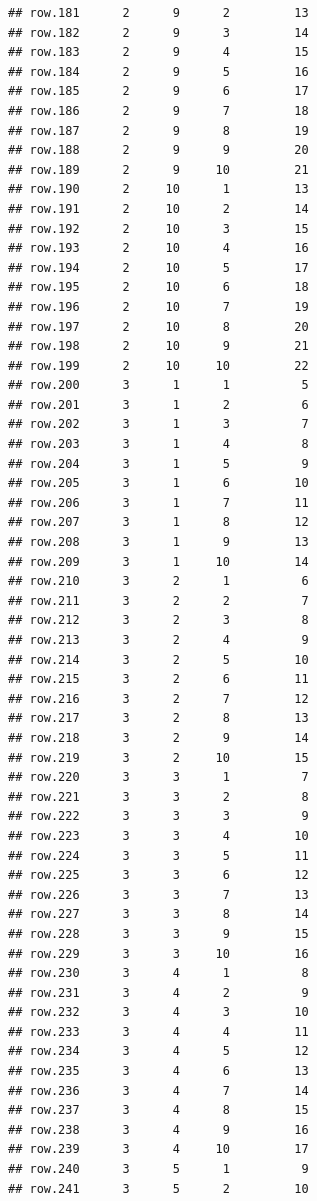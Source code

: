 \documentclass[
]{article}
\begin{document}
\begin{verbatim}
## row.181      2      9      2         13
## row.182      2      9      3         14
## row.183      2      9      4         15
## row.184      2      9      5         16
## row.185      2      9      6         17
## row.186      2      9      7         18
## row.187      2      9      8         19
## row.188      2      9      9         20
## row.189      2      9     10         21
## row.190      2     10      1         13
## row.191      2     10      2         14
## row.192      2     10      3         15
## row.193      2     10      4         16
## row.194      2     10      5         17
## row.195      2     10      6         18
## row.196      2     10      7         19
## row.197      2     10      8         20
## row.198      2     10      9         21
## row.199      2     10     10         22
## row.200      3      1      1          5
## row.201      3      1      2          6
## row.202      3      1      3          7
## row.203      3      1      4          8
## row.204      3      1      5          9
## row.205      3      1      6         10
## row.206      3      1      7         11
## row.207      3      1      8         12
## row.208      3      1      9         13
## row.209      3      1     10         14
## row.210      3      2      1          6
## row.211      3      2      2          7
## row.212      3      2      3          8
## row.213      3      2      4          9
## row.214      3      2      5         10
## row.215      3      2      6         11
## row.216      3      2      7         12
## row.217      3      2      8         13
## row.218      3      2      9         14
## row.219      3      2     10         15
## row.220      3      3      1          7
## row.221      3      3      2          8
## row.222      3      3      3          9
## row.223      3      3      4         10
## row.224      3      3      5         11
## row.225      3      3      6         12
## row.226      3      3      7         13
## row.227      3      3      8         14
## row.228      3      3      9         15
## row.229      3      3     10         16
## row.230      3      4      1          8
## row.231      3      4      2          9
## row.232      3      4      3         10
## row.233      3      4      4         11
## row.234      3      4      5         12
## row.235      3      4      6         13
## row.236      3      4      7         14
## row.237      3      4      8         15
## row.238      3      4      9         16
## row.239      3      4     10         17
## row.240      3      5      1          9
## row.241      3      5      2         10

\end{verbatim}
\end{document}
